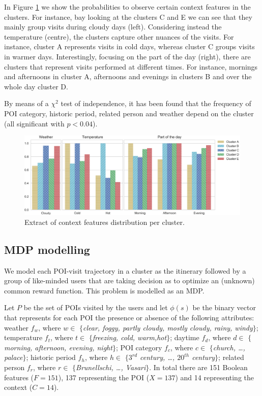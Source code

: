 In Figure \ref{fig:cluster_contex} we show the probabilities to observe certain context features in the clusters. For instance, bay looking at the clusters C and E we can see that they mainly group  visits during cloudy days (left). Considering instead the temperature (centre), the clusters capture other nuances of the visits. For instance, cluster A represents visits in cold days, whereas cluster C groups visits in warmer days. Interestingly, focusing on the part of the day (right), there are clusters that represent visits performed at different times. For instance, mornings and afternoons in cluster A, afternoons and evenings in clusters B and over the whole day cluster D. 

By means of a $\chi^2$ test of independence, it has been found that the frequency of POI category, historic period, related person and weather depend on the cluster (all significant with $p<0.04$).

\begin{figure}
	\centering
	\includegraphics[width=1\linewidth]{cluster_comparison_contextfeatures}
	\caption{Extract of context features distribution per cluster.}
	\label{fig:cluster_contex}
\end{figure}

\subsection{MDP modelling}
We model each POI-visit trajectory in a cluster as the itinerary followed by a group of like-minded users that are taking decision as to optimize an (unknown) common reward function.
This problem is modelled as an MDP. 

Let $P$ be the set of POIs visited by the users and let $\phi(s)$ be the binary vector that represents for each POI the presence or absence of the following attributes: weather \textit{$f_w$}, where $w \in$ \textit{$\{$clear, foggy, partly cloudy, mostly cloudy, rainy, windy$\}$}; temperature \textit{$f_t$}, where $t \in $ \textit{$\{$freezing, cold, warm,hot$\}$}; daytime \textit{$f_d$}, where $d \in$ \textit{$\{$morning, afternoon, evening, night$\}$}; 
POI category \textit{$f_c$}, where $c \in$ \textit{$\{$church, \dots, palace$\}$}; historic period \textit{$f_h$}, where $h \in$  \textit{$\{3^{rd}$ century, \dots, $20^{th}$ century$\}$}; related person \textit{$f_r$}, where $r \in$ \textit{$\{$Brunellschi, \dots, Vasari$\}$}. 
In total there are 151 Boolean features ($F=151$), 137 representing the POI ($X=137$) and 14 representing the context ($C=14$). 


